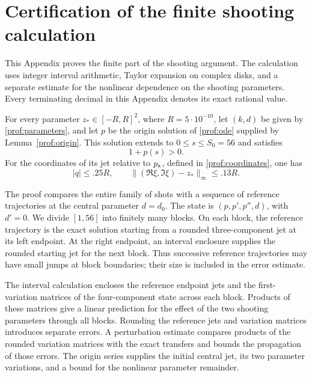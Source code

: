 \section{Certification of the finite shooting calculation}
\label{cert:appendix}
\label{sec:certificate}
\label{cert:section}

This Appendix proves the finite part of the shooting argument.  The calculation
uses integer interval arithmetic, Taylor expansion on complex disks, and a
separate estimate for the nonlinear dependence on the shooting parameters.
Every terminating decimal in this Appendix denotes its exact rational value.

\begin{proposition}\label{cert:shoot}
For every parameter \(z_*\in[-R,R]^2\), where \(R=5\cdot10^{-10}\), let
\((k,d)\) be given by \eqref{prof:parameters}, and let \(p\) be the origin
solution of \eqref{prof:ode} supplied by Lemma~\ref{prof:origin}.
This solution extends to \(0\le s\le S_0=56\) and satisfies
\[
 1+p(s)>0.
\]
For the coordinates of its jet relative to \(p_{\rm a}\), defined in
\eqref{prof:coordinates}, one has
\begin{equation}\label{cert:conclusion}
 |q|\le .25R,\qquad
 \big\|(\Re\xi,\Im\xi)-z_*\big\|_\infty\le .13R.
\end{equation}
\end{proposition}

The proof compares the entire family of shots with a sequence of
reference trajectories at the central parameter \(d=d_0\).  The state
is \((p,p',p'',d)\), with \(d'=0\).  We divide \([1,56]\) into finitely
many blocks.  On each block, the reference trajectory is the exact
solution starting from a rounded three-component jet at its left
endpoint.  At the right endpoint, an interval enclosure supplies the
rounded starting jet for the next block.  Thus successive reference
trajectories may have small jumps at block boundaries; their size is
included in the error estimate.

The interval calculation encloses the reference endpoint jets and
the first-variation matrices of the four-component state across each
block.  Products of these matrices give a linear prediction for the
effect of the two shooting parameters through all blocks.  Rounding the reference jets
and variation matrices introduces separate errors.  A perturbation
estimate compares products of the rounded variation matrices with
the exact transfers and bounds the propagation of those errors.
The origin series supplies the initial central jet, its two parameter
variations, and a bound for the nonlinear parameter remainder.

